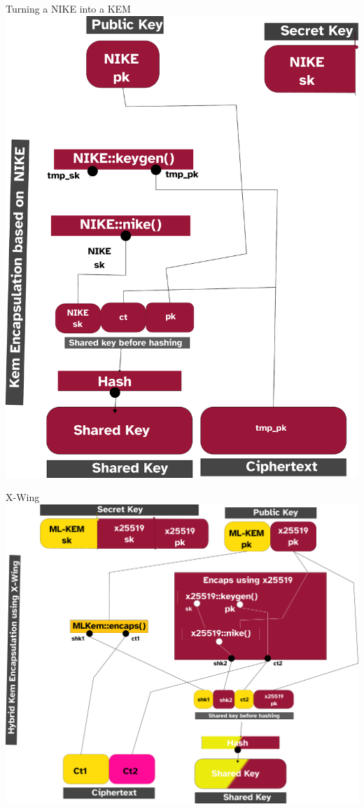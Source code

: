 \begin{frame}{Turning a NIKE into a KEM}
  \hypertarget{dhkem}{}
  \centering
    \includegraphics[height=.85\textheight]{graphics/dhkem.pdf}
\end{frame}

\begin{frame}{X-Wing}
  \hypertarget{x-wing}{}
  \centering
  \includegraphics[height=.85\textheight]{graphics/xwing.pdf}
\end{frame}

